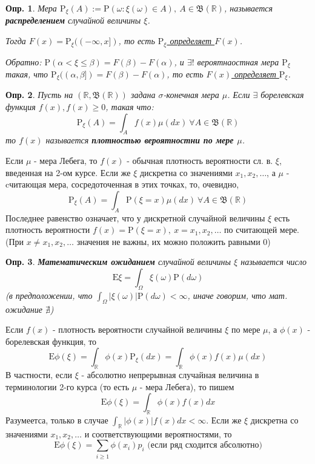 \documentclass[10pt]{article}
\newtheorem{definition}{Опр.}
\theoremstyle{theorem}
\newcommand\defin[1]{\textbf{#1}}
\def\R{
    \mathbb{R}
}
\def\E{
    \mathrm{E}
}
\def\P{
    \mathrm{P}
}
\def\B{
    \mathfrak{B}
}
\begin{document}
\begin{definition}
    Мера $\P_\xi(A) := \P(\omega: \xi(\omega) \in A), \ A \in \B(\R)$,
    называется \defin{распределением} случайной величины $\xi$.

    Тогда $F(x) = \P_\xi((-\infty, x])$, то есть \underline{$\P_\xi$ определяет $F(x)$}.
    
    Обратно: $\P (\alpha < \xi \leq \beta) = F(\beta) - F(\alpha)$, 
    и $\exists!$ вероятнаостная мера $\P_\xi$ такая, что
    $\P_\xi((\alpha, \beta]) = F(\beta) - F(\alpha)$, то есть \underline{$F(x)$ определяет $\P_\xi$}.
\end{definition}
\begin{definition}
    Пусть на $(\R, \B(\R))$ задана $\sigma$-конечная мера $\mu$.
    Если $\exists$ борелевская функция $f(x), f(x) \geq 0$, такая что:
     $$\P_\xi(A) = \int_Af(x)\mu(dx) \ \forall A \in \B(\R)$$
    то $f(x)$ называется \defin{плотностью вероятностни по мере $\mu$}.
\end{definition}
Если $\mu$ - мера Лебега, то $f(x)$ - обычная плотность вероятности сл. в. $\xi$,
введенная на 2-ом курсе. Если же $\xi$ дискретна со значениями $x_1, x_2, \ldots$,
а $\mu$ - cчитающая мера, сосредоточенная в этих точках, то, очевидно,
$$\P_\xi(A) = \int_A \P(\xi = x)\mu(dx) \ \forall A \in \B(\R)$$
Последнее равенство означает, что у дискретной случайной величины $\xi$
есть плотность вероятности $f(x) = \P(\xi = x), \ x = x_1, x_2, \ldots$
по считающей мере. (При $ x \neq x_1, x_2, \ldots$ значения не важны, их
можно положить равными 0)
\begin{definition}
    \defin{Математическим ожиданием} случайной величины $\xi$ называется число
    $$\E\xi = \int_\Omega \xi(\omega)\P(d\omega)$$
    (в предположении, что $\int_\Omega |\xi(\omega)| \P(d\omega) < \infty$,
    иначе говорим, что мат. ожидание $\nexists$)
\end{definition}
    Если $f(x)$ - плотность вероятности случайной величины $\xi$ по мере $\mu$,
    а $\phi(x)$ - борелевская функция, то
    $$\E\phi(\xi) = \int_\R\phi(x)\P_\xi(dx) = \int_\R\phi(x)f(x)\mu(dx)$$
    В частности, если $\xi$ - абсолютно непрерывная случайная величина в
    терминологии 2-го курса (то есть $\mu$ - мера Лебега), то пишем
    $$\E\phi(\xi) = \int_\R\phi(x)f(x)dx$$
    Разумеетса, только в случае $\int_\R|\phi(x)|f(x)dx < \infty$.
    Если же $\xi$ дискретна со значениями $x_1, x_2, \ldots$ и соответствующими
    вероятностями, то 
    $$\E\phi(\xi) = \sum_{i \geq 1} \phi(x_i)p_i \mbox{ (если ряд сходится абсолютно)}$$
\end{document}
